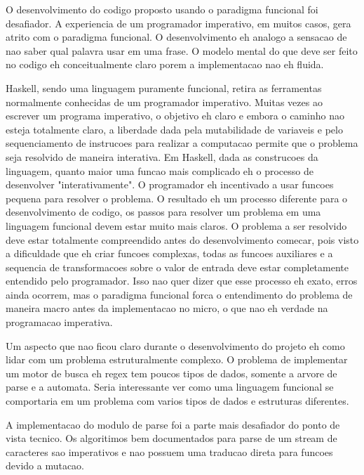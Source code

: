 O desenvolvimento do codigo proposto usando o paradigma funcional foi desafiador.
A experiencia de um programador imperativo, em muitos casos, gera atrito com o paradigma funcional.
O desenvolvimento eh analogo a sensacao de nao saber qual palavra usar em uma frase.
O modelo mental do que deve ser feito no codigo eh conceitualmente claro porem a implementacao nao eh fluida.

Haskell, sendo uma linguagem puramente funcional, retira as ferramentas normalmente conhecidas de um programador imperativo.
Muitas vezes ao escrever um programa imperativo, o objetivo eh claro e embora o caminho nao esteja totalmente claro, a liberdade dada pela mutabilidade de variaveis e pelo sequenciamento de instrucoes para realizar a computacao permite que o problema seja resolvido de maneira interativa.
Em Haskell, dada as construcoes da linguagem, quanto maior uma funcao mais complicado eh o processo de desenvolver "interativamente".
O programador eh incentivado a usar funcoes pequena para resolver o problema.
O resultado eh um processo diferente para o desenvolvimento de codigo, os passos para resolver um problema em uma linguagem funcional devem estar muito mais claros.
O problema a ser resolvido deve estar totalmente compreendido antes do desenvolvimento comecar, pois visto a dificuldade que eh criar funcoes complexas, todas as funcoes auxiliares e a sequencia de transformacoes sobre o valor de entrada deve estar completamente entendido pelo programador.
Isso nao quer dizer que esse processo eh exato, erros ainda ocorrem, mas o paradigma funcional forca o entendimento do problema de maneira macro antes da implementacao no micro, o que nao eh verdade na programacao imperativa.

Um aspecto que nao ficou claro durante o desenvolvimento do projeto eh como lidar com um problema estruturalmente complexo.
O problema de implementar um motor de busca eh regex tem poucos tipos de dados, somente a arvore de parse e a automata.
Seria interessante ver como uma linguagem funcional se comportaria em um problema com varios tipos de dados e estruturas diferentes.

A implementacao do modulo de parse foi a parte mais desafiador do ponto de vista tecnico.
Os algoritimos bem documentados para parse de um stream de caracteres sao imperativos e nao possuem uma traducao direta para funcoes devido a mutacao.

